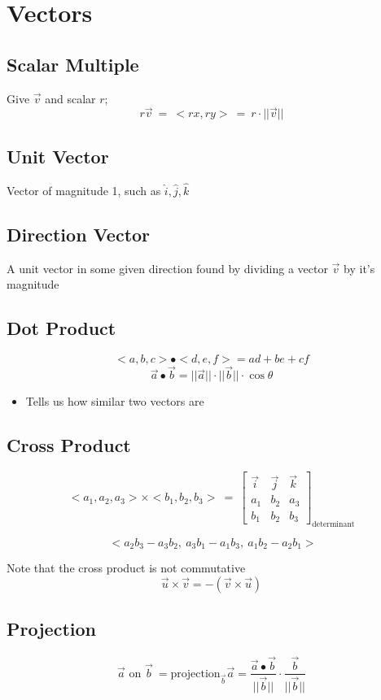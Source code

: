\documentclass[12pt]{article}
\begin{document}

\section{Vectors}
\subsection{Scalar Multiple}
Give $\vec{v}$ and scalar $r$; 
$$r\vec{v}\ =\ <rx, ry>\ =\ r\cdot||\vec{v}||$$

\subsection{Unit Vector}
Vector of magnitude 1, such as $\hat{i}, \hat{j}, \hat{k}$

\subsection{Direction Vector}
A unit vector in some given direction found by dividing a vector $\vec{v}$ by it's magnitude

\subsection{Dot Product}
$$<a,b,c> \bullet <d,e,f> = ad + be + cf$$
$$\vec{a} \bullet \vec{b} = ||\vec{a}||\cdot ||\vec{b}|| \cdot \cos\theta$$

\begin{itemize}
    \item Tells us how similar two vectors are
\end{itemize}

\subsection{Cross Product}
$$<a_1, a_2, a_3> \times <b_1, b_2, b_3>\ =\ \begin{bmatrix}
\vec{i} & \vec{j} & \vec{k}\\
a_1 & b_2 & a_3\\
b_1 & b_2 & b_3
\end{bmatrix}_{\text{determinant}}$$

$$\ <a_2b_3 - a_3b_2,\ a_3b_1-a_1b_3,\ a_1b_2-a_2b_1>$$

\noindent Note that the cross product is not commutative
$$\vec{u} \times \vec{v} = -(\vec{v} \times \vec{u})$$


\subsection{Projection}


$$\vec{a}\text{ on }\vec{b}\ = \text{projection}_{\vec{b}}\vec{a} = \frac{\vec{a} \bullet \vec{b}}{||\vec{b}||} \cdot \frac{\vec{b}}{||\vec{b}||}$$
\end{document}
